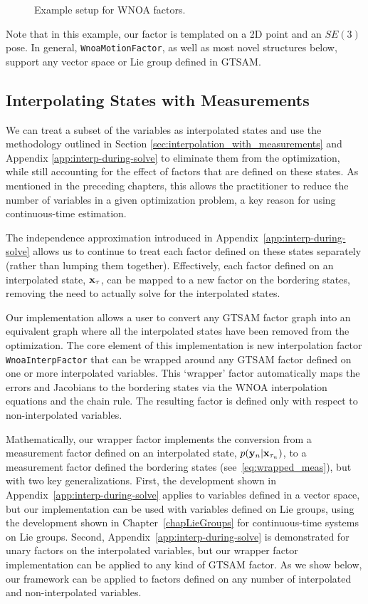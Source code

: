\begin{figure}[ht!]
	\centering
	\caption{Example setup for WNOA factors.}
	\label{fig:lst-wnoa}
\end{figure}

Note that in this example, our factor is templated on a 2D point and an $SE(3)$ pose. In general, \texttt{WnoaMotionFactor}, as well as most novel structures below, support any vector space or Lie group defined in \ac{GTSAM}. 

\subsection{Interpolating States with Measurements}\label{sec:during-query-implem}

We can treat a subset of the variables as interpolated states and use the methodology outlined in Section \ref{sec:interpolation_with_measurements} and Appendix \ref{app:interp-during-solve} to eliminate them from the optimization, while still accounting for the effect of factors that are defined on these states.
As mentioned in the preceding chapters, this allows the practitioner to reduce the number of variables in a given optimization problem, a key reason for using continuous-time estimation.

The independence approximation introduced in Appendix~\ref{app:interp-during-solve} allows us to continue to treat each factor defined on these states separately (rather than lumping them together).
Effectively, each factor defined on an interpolated state, $\mathbf{x}_{\tau}$, can be mapped to a new factor on the bordering states, removing the need to actually solve for the interpolated states.

Our implementation allows a user to convert any \ac{GTSAM} factor graph into an equivalent graph where all the interpolated states have been removed from the optimization.
The core element of this implementation is new interpolation factor \texttt{WnoaInterpFactor} that can be wrapped around any \ac{GTSAM} factor defined on one or more interpolated variables.
This `wrapper' factor automatically maps the errors and Jacobians to the bordering states via the \ac{WNOA} interpolation equations and the chain rule.
The resulting factor is defined only with respect to non-interpolated variables.

Mathematically, our wrapper factor implements the conversion from a measurement factor defined on an interpolated state, $p(\mathbf{y}_n|\mathbf{x}_{\tau_n})$, to a measurement factor defined the bordering states (see~\eqref{eq:wrapped_meas}), but with two key generalizations. First, the development shown in Appendix~\ref{app:interp-during-solve} applies to variables defined in a vector space, but our implementation can be used with variables defined on Lie groups, using the development shown in Chapter~\ref{chapLieGroups} for continuous-time systems on Lie groups. Second, Appendix~\ref{app:interp-during-solve} is demonstrated for unary factors on the interpolated variables, but our wrapper factor implementation can be applied to any kind of \ac{GTSAM} factor. As we show below, our framework can be applied to factors defined on any number of interpolated and non-interpolated variables.


